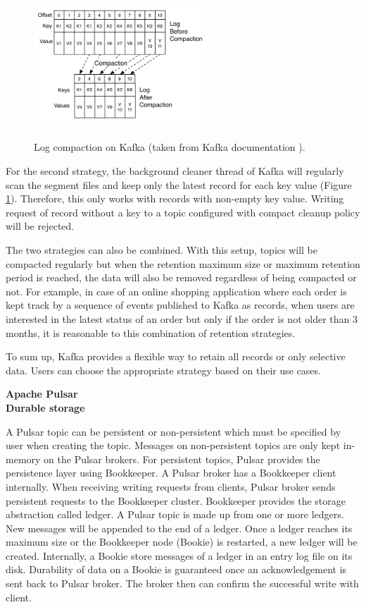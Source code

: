\begin{figure}[h]
	\centering
	\includegraphics[width=6.5cm,height=5.5cm]{images/compact-kafka.png}
	\caption{Log compaction on Kafka (taken from Kafka documentation \cite{kafkadocumentation}).}
	\label{fig:compactekafka}
\end{figure}
For the second strategy, the background cleaner thread of Kafka will regularly scan the segment files and keep only the latest record for each key value (Figure \ref{fig:compactekafka}). Therefore, this only works with records with non-empty key value. Writing request of record without a key to a topic configured with compact cleanup policy will be rejected.


The two strategies can also be combined. With this setup, topics will be compacted regularly but when the retention maximum size or maximum retention period is reached, the data will also be removed regardless of being compacted or not. For example, in case of an online shopping application where each order is kept track by a sequence of events published to Kafka as records, when users are interested in the latest status of an order but only if the order is not older than 3 months, it is reasonable to this combination of retention strategies.

To sum up, Kafka provides a flexible way to retain all records or only selective data. Users can choose the appropriate strategy based on their use cases. 

\large \textbf{Apache Pulsar}\\
\normalsize
\textbf{Durable storage}

A Pulsar topic can be persistent or non-persistent which must be specified by user when creating the topic. Messages on non-persistent topics are only kept in-memory on the Pulsar brokers. For persistent topics, Pulsar provides the persistence layer using Bookkeeper.  A Pulsar broker has a Bookkeeper client internally. When receiving writing requests from clients, Pulsar broker sends persistent requests to the Bookkeeper cluster. Bookkeeper provides the storage abstraction called ledger. A Pulsar topic is made up from one or more ledgers. New messages will be appended to the end of a ledger. Once a ledger reaches its maximum size or the Bookkeeper node (Bookie) is restarted, a new ledger will be created. Internally, a Bookie store messages of a ledger in an entry log file on its disk. Durability of data on a Bookie is guaranteed once an acknowledgement is sent back to Pulsar broker. The broker then can confirm the successful write with client.

